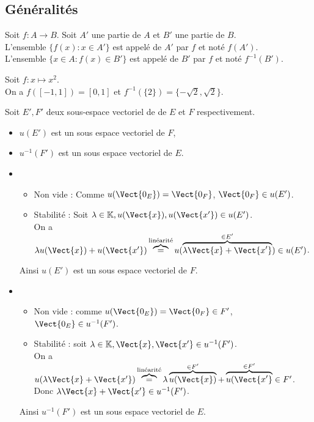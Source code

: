 \documentclass{book}
\begin{document}
\subsection{Généralités}
\begin{Definition}
Soit $f:A\to B$. Soit $A'$ une partie de $A$ et $B'$ une partie de $B$.\\
L'ensemble $\{f(x): x  \in  A'\}$ est appelé  de $A'$ par $f$ et noté $f(A')$.\\
L'ensemble $\{x\in A : f(x)  \in  B'\}$ est appelé  de $B'$ par $f$ et noté $f^{-1}(B')$.\\
\end{Definition}
\begin{Exemple}[Carré]
Soit $f:x\mapsto x^2$.\\
On a $f([-1,1])=[0,1]$ et $f^{-1}(\{2\})=\{-\sqrt{2},\sqrt{2}\}$.
\end{Exemple}
\begin{Proposition}
Soit $E',F'$ deux sous-espace vectoriel de de $E$ et $F$ respectivement.
\begin{itemize}
\item $u(E')$ est un sous espace vectoriel de $F$,
\item $u^{-1}(F')$ est un sous espace vectoriel de $E$.
\end{itemize}
\end{Proposition}
\begin{Demonstration}
\begin{itemize}
\item 
\begin{itemize}
\item Non vide : Comme $u(\Vect{0_E})=\Vect{0_F}$, $\Vect{0_F}\in u(E')$.\\
\item Stabilité : Soit $\lambda\in\K, u(\Vect{x}),u(\Vect{x'})\in u(E')$.\\
On a $\lambda u(\Vect{x})+u(\Vect{x'})\overbrace{=}^{\text{linéarité}}u(\overbrace{\lambda\Vect{x}+\Vect{x'}}^{\in E'})\in u(E')$.\\
\end{itemize}
Ainsi $u(E')$ est un sous espace vectoriel de $F$.
\item 
\begin{itemize}
\item Non vide : comme $u(\Vect{0_E})=\Vect{0_F}\in F'$, $\Vect{0_E}\in u^{-1}(F')$.\\
\item Stabilité : soit $\lambda\in\K, \Vect{x},\Vect{x'}\in u^{-1}(F')$.\\
 On a $ u(\lambda\Vect{x}+\Vect{x'})\overbrace{=}^{\text{linéarité}}\lambda \overbrace{u(\Vect{x})}^{\in F'}+\overbrace{u(\Vect{x'}}^{\in F'}\in F'$. Donc $\lambda\Vect{x}+\Vect{x'}\in u^{-1}(F')$.
\end{itemize}
Ainsi $u^{-1}(F')$ est un sous espace vectoriel de $E$.
\end{itemize}
\end{Demonstration}
\end{document}
